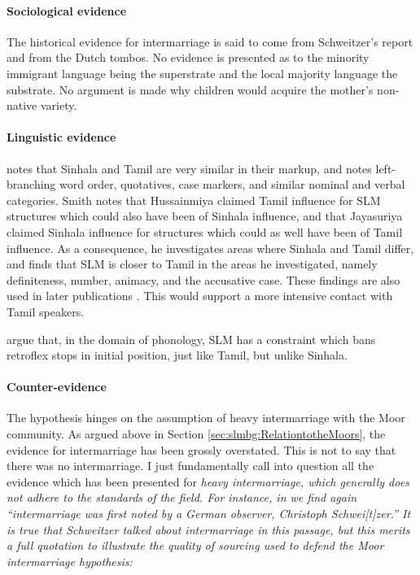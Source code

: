 \paragraph{Sociological evidence}
The historical evidence for intermarriage is said to come from Schweitzer's report and from the Dutch tombos. No evidence is presented as to the minority immigrant language being the superstrate and the local majority language the substrate. No argument is made why children would acquire the mother's non-native variety.

\paragraph{Linguistic evidence}
\citet{SmithRH} notes that Sinhala and Tamil are very similar in their markup, and notes left-branching word order, quotatives, case markers, and similar nominal and verbal categories. Smith notes that Hussainmiya claimed Tamil influence for SLM structures which could also have been of Sinhala influence, and that Jayasuriya claimed Sinhala influence for structures which could as well have been of Tamil influence. As a consequence, he investigates areas where Sinhala and Tamil differ, and finds that SLM is closer to Tamil in the areas he investigated, namely definiteness, number, animacy, and the accusative case. These findings are also used in later publications  \citep{SmithEtAl2004, SmithEtAl2006cll}. This would support a more intensive contact with Tamil speakers.

\citet{SmithEtAl2004} argue that, in the domain of phonology, SLM has a constraint which bans retroflex stops in initial position, just like Tamil, but unlike Sinhala.

\paragraph{Counter-evidence}
The hypothesis hinges on the assumption of heavy intermarriage with the Moor community. As argued above in Section \ref{sec:slmbg:RelationtotheMoors}, the evidence for intermarriage has been grossly overstated. This is not to say that there was no intermarriage. I just fundamentally call into question all the evidence which has been presented for \em heavy \em  intermarriage, which generally does not adhere to the standards of the field. For instance, in \citet[176]{SmithEtAl2006cll} we find again ``intermarriage was first noted by a German observer, Christoph Schwei[t]zer.'' It is true that Schweitzer talked about intermarriage in this passage, but this merits a full quotation to illustrate the quality of sourcing used to defend the Moor intermarriage hypothesis:

